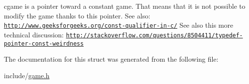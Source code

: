cgame is a pointer toward a constant game. That means that it is not possible to modify the game thanks to this pointer. See also\+: \href{http://www.geeksforgeeks.org/const-qualifier-in-c/}{\tt http\+://www.\+geeksforgeeks.\+org/const-\/qualifier-\/in-\/c/} See also this more technical discussion\+: \href{http://stackoverflow.com/questions/8504411/typedef-pointer-const-weirdness}{\tt http\+://stackoverflow.\+com/questions/8504411/typedef-\/pointer-\/const-\/weirdness} 

The documentation for this struct was generated from the following file\+:\begin{DoxyCompactItemize}
\item 
include/\hyperlink{game_8h}{game.\+h}\end{DoxyCompactItemize}
